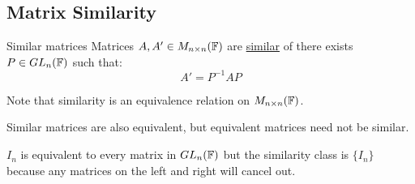 \documentclass[../Main.tex]{subfiles}
\begin{document}
\subsection{Matrix Similarity}
\begin{definition}{Similar matrices}
    Matrices $A, A' \in M_{n \times n}(\mathbb{F})$ are \underline{similar} of there exists $P \in GL_n(\mathbb{F})$ such that:
    \begin{equation*}
        A' = P^{-1} A P
    \end{equation*}
\end{definition}
\begin{remarks}
    \item Note that similarity is an equivalence relation on $M_{n \times n}(\mathbb{F})$.
    \item Similar matrices are also equivalent, but equivalent matrices need not be similar.
\end{remarks}
\begin{example}
    $I_n$ is equivalent to every matrix in $GL_n(\mathbb{F})$ but the similarity class is $\{I_n\}$ because any matrices on the left and right will cancel out.
\end{example}
\end{document}

